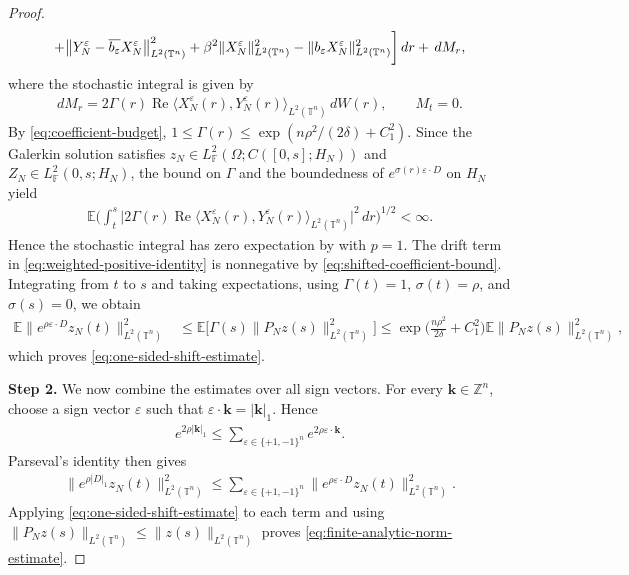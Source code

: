 \documentclass[print,wide]{draft}
\begin{document}
\begin{proof}
\begin{align}
+\bigl\lVert Y_N^\varepsilon-
\overline{b_\varepsilon}X_N^\varepsilon\bigr\rVert_{L^2(\mathbb{T}^n)}^2
+\beta^2\lVert X_N^\varepsilon\rVert_{L^2(\mathbb{T}^n)}^2 
-\lVert b_\varepsilon X_N^\varepsilon\rVert_{L^2(\mathbb{T}^n)}^2
\biggr]\,dr+\,dM_r,\notag
\end{align}
where the stochastic integral is given by
\begin{align*}
dM_r=2\Gamma(r)\operatorname{Re}\langle X_N^\varepsilon(r),Y_N^\varepsilon(r)\rangle_{L^2(\mathbb{T}^n)}\,dW(r),
\qquad M_t=0.
\end{align*}
By \eqref{eq:coefficient-budget}, $1\leq\Gamma(r)\leq\exp(n\rho^2/(2\delta)+C_1^2)$.
Since the Galerkin solution satisfies
$z_N\in L^2_{\mathbb F}(\Omega;C([0,s];H_N))$ and $Z_N\in L^2_{\mathbb F}(0,s;H_N)$,
the bound on $\Gamma$ and the boundedness of $e^{\sigma(r)\varepsilon\cdot D}$ on $H_N$ yield
\begin{align*}
\mathbb E\biggl(\int_t^s
\bigl|2\Gamma(r)\operatorname{Re}\langle X_N^\varepsilon(r),Y_N^\varepsilon(r)\rangle_{L^2(\mathbb T^n)}\bigr|^2\,dr\biggr)^{1/2}<\infty.
\end{align*}
Hence the stochastic integral has zero expectation by
\cite[Theorem~2.130, item~3)]{Lue2021a} with $p=1$.
The drift term in \eqref{eq:weighted-positive-identity} is nonnegative by
\eqref{eq:shifted-coefficient-bound}. Integrating from \(t\) to \(s\) and
taking expectations, using \(\Gamma(t)=1\), \(\sigma(t)=\rho\), and \(\sigma(s)=0\),
we obtain
\begin{align*}
\mathbb{E}\bigl\lVert e^{\rho\varepsilon\cdot D}z_N(t)\bigr\rVert_{L^2(\mathbb{T}^n)}^2
&\leq\mathbb{E}\bigl[\Gamma(s)\lVert P_N z(s)\rVert_{L^2(\mathbb{T}^n)}^2\bigr] \leq
\exp\biggl(\frac{n\rho^2}{2\delta}+C_1^2\biggr)
\mathbb{E}\lVert P_N z(s)\rVert_{L^2(\mathbb{T}^n)}^2,
\end{align*}
which proves \eqref{eq:one-sided-shift-estimate}.

\textbf{Step 2.} We now combine the estimates over all sign vectors.
For every \(\mathbf k\in\mathbb Z^n\), choose a sign vector \(\varepsilon\) such that
\(\varepsilon\cdot \mathbf k=|\mathbf k|_1\). Hence
\begin{align*}
e^{2\rho|\mathbf k|_1}
\leq\sum_{\varepsilon\in\{+1,-1\}^n}e^{2\rho\varepsilon\cdot \mathbf k}.
\end{align*}
Parseval's identity then gives
\begin{align*}
\bigl\lVert e^{\rho|D|_1}z_N(t)\bigr\rVert_{L^2(\mathbb{T}^n)}^2
\leq
\sum_{\varepsilon\in\{+1,-1\}^n}
\bigl\lVert e^{\rho\varepsilon\cdot D}z_N(t)\bigr\rVert_{L^2(\mathbb{T}^n)}^2.
\end{align*}
Applying \eqref{eq:one-sided-shift-estimate} to each term and using
\(\|P_Nz(s)\|_{L^2(\mathbb{T}^n)}\leq\|z(s)\|_{L^2(\mathbb{T}^n)}\) proves
\eqref{eq:finite-analytic-norm-estimate}.
\end{proof}
\end{document}
